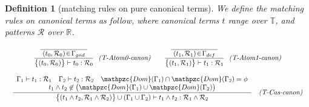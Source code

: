 \documentclass[12pt]{article}
\newtheorem{Definition}{Definition}[section]
\begin{document}
\pagebreak
\begin{Definition}[matching rules on pure canonical terms]
  We define the matching rules on canonical terms as follow,
  where canonical terms $t$ range over $\mathbb{T}$, and patterns
  $\mathcal{R}$ over $\mathbb{R}$.
  
  \begin{displaymath}
    \begin{array}{c}
      
      \begin{array}{rl}
        \begin{array}{rl}
          \dfrac{
            \dfrac{}{
              \raisebox{0.6ex}[2.3ex][0ex]{
                $(t_0, \mathcal{R}_0) \!\in\! \Gamma_{gnd}$
              }
            }
          }{
            \bigl\{(t_0, \mathcal{R}_0) \bigr\} \vdash t_0 : \mathcal{R}_0
          }  &  \!\! \text{\it (T-Atom0-canon)}
        \end{array}

        & \begin{array}{rl}
          \dfrac{
            \dfrac{}{
              \raisebox{0.6ex}[2.3ex][0ex]{
                $(t_1, \mathcal{R}_1) \!\in\! \Gamma_{def}$
              }
            }
          }{
            \bigl\{(t_1, \mathcal{R}_1) \bigr\} \vdash t_1 : \mathcal{R}_1
          }  &  \!\! \text{\it (T-Atom1-canon)}
          \end{array}
      \end{array}  \\
      \\
      
      \begin{array}{rl}
        \dfrac{
          \begin{array}{c}
            \Gamma_1 \vdash t_1 : \mathcal{R}_1
             \quad \Gamma_2 \vdash t_2 : \mathcal{R}_2
              \quad \mathpzc{Dom}(\Gamma_1) \cap \mathpzc{Dom}(\Gamma_2)
              = \phi  \\
              t_1 \wedge t_2 \not\in \bigl(\mathpzc{Dom}(\Gamma_1) \cup
               \mathpzc{Dom}(\Gamma_2) \bigr)
          \end{array}
        }{
          \bigl\{(t_1 \wedge t_2, \mathcal{R}_1 \wedge \mathcal{R}_2)
           \bigr\} \cup (\Gamma_1 \cup \Gamma_2) \vdash
            t_1 \wedge t_2 : \mathcal{R}_1 \wedge \mathcal{R}_2
        }  &  \text{\it (T-Cas-canon)}  \\
        \\
        

\end{array}
\end{array}
\end{displaymath}
\end{Definition}
\end{document}
